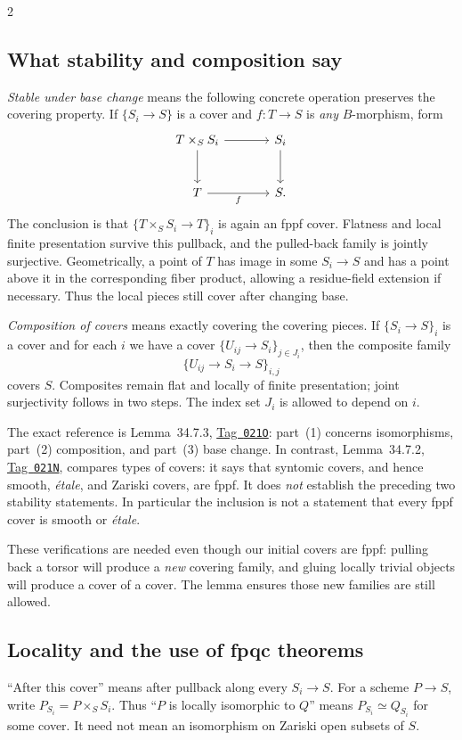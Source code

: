 \documentclass[12pt]{memoir}
\newcommand{\BGtag}[1]{\href{https://stacks.math.columbia.edu/tag/#1}{Tag~\texttt{#1}}}
\begin{document}
\begin{multicols}{2}
\subsection{What stability and composition say}\label{subsec:coverrules}
\emph{Stable under base change} means the following concrete operation
preserves the covering property. If $\{S_i\to S\}$ is a cover and
$f:T\to S$ is \emph{any} $B$-morphism, form
\[
\begin{tikzcd}[column sep=large,row sep=large]
T\times_S S_i \arrow[r] \arrow[d] &S_i \arrow[d]\\
T \arrow[r,"f"'] &S.
\end{tikzcd}
\]
The conclusion is that $\{T\times_S S_i\to T\}_i$ is again an fppf
cover. Flatness and local finite presentation survive this pullback,
and the pulled-back family is jointly surjective. Geometrically, a
point of $T$ has image in some $S_i\to S$ and has a point above it in
the corresponding fiber product, allowing a residue-field extension
if necessary. Thus the local pieces still cover after changing base.

\emph{Composition of covers} means exactly covering the covering
pieces. If $\{S_i\to S\}_i$ is a cover and for each $i$ we have a
cover $\{U_{ij}\to S_i\}_{j\in J_i}$, then the composite family
\[
 \{U_{ij}\longrightarrow S_i\longrightarrow S\}_{i,j}
\]
covers $S$. Composites remain flat and locally of finite presentation;
joint surjectivity follows in two steps. The index set $J_i$ is allowed
to depend on $i$.

The exact reference is Lemma~34.7.3, \BGtag{021O}: part~(1) concerns
isomorphisms, part~(2) composition, and part~(3) base change. In
contrast, Lemma~34.7.2, \BGtag{021N}, compares types of covers: it says
that syntomic covers, and hence smooth, \emph{\'etale}, and Zariski
covers, are fppf. It does \emph{not} establish the preceding two
stability statements. In particular the inclusion is not a statement
that every fppf cover is smooth or \emph{\'etale}.

These verifications are needed even though our initial covers are
fppf: pulling back a torsor will produce a \emph{new} covering family,
and gluing locally trivial objects will produce a cover of a cover.
The lemma ensures those new families are still allowed.

\subsection{Locality and the use of fpqc theorems}
``After this cover'' means after pullback along every $S_i\to S$.
For a scheme $P\to S$, write $P_{S_i}=P\times_S S_i$. Thus
``$P$ is locally isomorphic to $Q$'' means $P_{S_i}\simeq Q_{S_i}$
for some cover. It need not mean an isomorphism on Zariski open
subsets of $S$.


\end{multicols}
\end{document}
